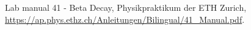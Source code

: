 
\begin{thebibliography}{99}


Lab manual 41 - Beta Decay, Physikpraktikum der ETH Zurich,  \url{https://ap.phys.ethz.ch/Anleitungen/Bilingual/41_Manual.pdf}.


\end{thebibliography}